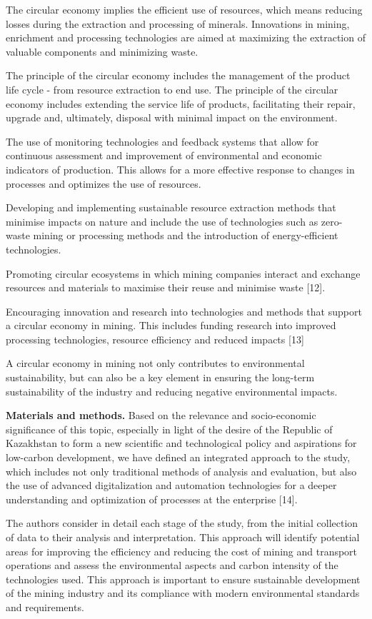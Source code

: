 \begin{multicols}{2}
The circular economy implies the efficient use of resources, which means
reducing losses during the extraction and processing of minerals.
Innovations in mining, enrichment and processing technologies are aimed
at maximizing the extraction of valuable components and minimizing
waste.

The principle of the circular economy includes the management of the
product life cycle - from resource extraction to end use. The principle
of the circular economy includes extending the service life of products,
facilitating their repair, upgrade and, ultimately, disposal with
minimal impact on the environment.

The use of monitoring technologies and feedback systems that allow for
continuous assessment and improvement of environmental and economic
indicators of production. This allows for a more effective response to
changes in processes and optimizes the use of resources.

Developing and implementing sustainable resource extraction methods that
minimise impacts on nature and include the use of technologies such as
zero-waste mining or processing methods and the introduction of
energy-efficient technologies.

Promoting circular ecosystems in which mining companies interact and
exchange resources and materials to maximise their reuse and minimise
waste {[}12{]}.

Encouraging innovation and research into technologies and methods that
support a circular economy in mining. This includes funding research
into improved processing technologies, resource efficiency and reduced
impacts {[}13{]}

A circular economy in mining not only contributes to environmental
sustainability, but can also be a key element in ensuring the long-term
sustainability of the industry and reducing negative environmental
impacts.

{\bfseries Materials and methods.} Based on the relevance and
socio-economic significance of this topic, especially in light of the
desire of the Republic of Kazakhstan to form a new scientific and
technological policy and aspirations for low-carbon development, we have
defined an integrated approach to the study, which includes not only
traditional methods of analysis and evaluation, but also the use of
advanced digitalization and automation technologies for a deeper
understanding and optimization of processes at the enterprise {[}14{]}.

The authors consider in detail each stage of the study, from the initial
collection of data to their analysis and interpretation. This approach
will identify potential areas for improving the efficiency and reducing
the cost of mining and transport operations and assess the environmental
aspects and carbon intensity of the technologies used. This approach is
important to ensure sustainable development of the mining industry and
its compliance with modern environmental standards and requirements.


\end{multicols}

